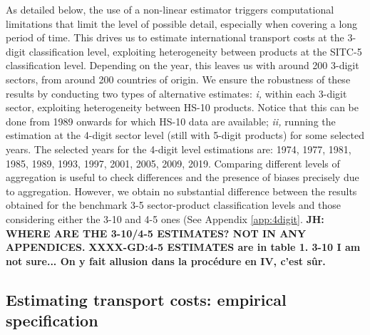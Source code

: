\documentclass[a4paper,11pt]{article}
\begin{document}
As detailed below, the use of a non-linear estimator triggers computational limitations that limit the level of possible detail, especially when covering a long period of time. This drives us to estimate international transport costs at the 3-digit classification level, exploiting heterogeneity between products at the SITC-5 classification level. Depending on the year, this leaves us with around 200 3-digit sectors, from around 200 countries of origin. We ensure the robustness of these results by conducting two types of alternative estimates: \textit{i,} within each 3-digit sector, exploiting heterogeneity between HS-10 products. Notice that this can be done from 1989 onwards for which HS-10 data are available; \textit{ii,} running the estimation at the 4-digit sector level (still with 5-digit products) for some selected years. The selected years for the 4-digit level estimations are: 1974, 1977, 1981, 1985, 1989, 1993, 1997, 2001, 2005, 2009, 2019. Comparing different levels of aggregation is useful to check differences and the presence of biases precisely due to aggregation. However, we obtain no substantial difference between the results obtained for the benchmark 3-5 sector-product classification levels and those considering either the 3-10 and 4-5 ones (See Appendix \ref{app:4digit}. \textbf{JH: WHERE ARE THE 3-10/4-5 ESTIMATES? NOT IN ANY APPENDICES.}
 \textbf{XXXX-GD:4-5 ESTIMATES are in table 1. 3-10 I am not sure... On y fait allusion dans la procédure en IV, c’est sûr.}



\subsection{Estimating transport costs: empirical specification}
\end{document}
